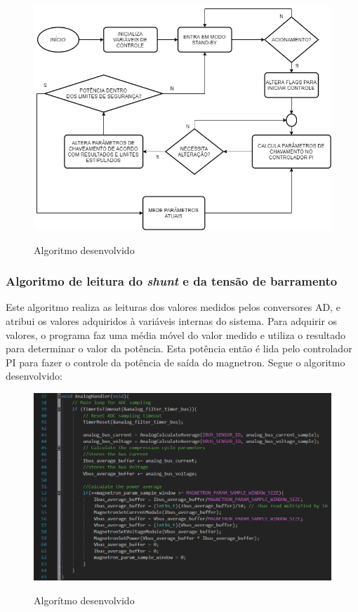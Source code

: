 \begin{figure}[H]
    \centering
    \caption{Algoritmo desenvolvido}
    \includegraphics[width=1\textwidth]{./dados/figuras/mwo_flow}
    \label{fig:figura-mwo_flow}
\end{figure}

\subsubsection{Algoritmo de leitura do \textit{shunt} e da tensão de barramento}
Este algoritmo realiza as leituras dos valores medidos pelos conversores AD, e atribui os valores adquiridos à variáveis internas do sistema. Para adquirir os valores, o programa faz uma média móvel do valor medido e utiliza o resultado para determinar o valor da potência. Esta potência então é lida pelo controlador PI para fazer o controle da potência de saída do magnetron. Segue o algoritmo desenvolvido:

\begin{figure}[H]
    \centering
    \caption{Algorítmo desenvolvido}
    \includegraphics[width=1\textwidth]{./dados/figuras/func_analog}
    \label{fig:figura-func_analog}
\end{figure}

